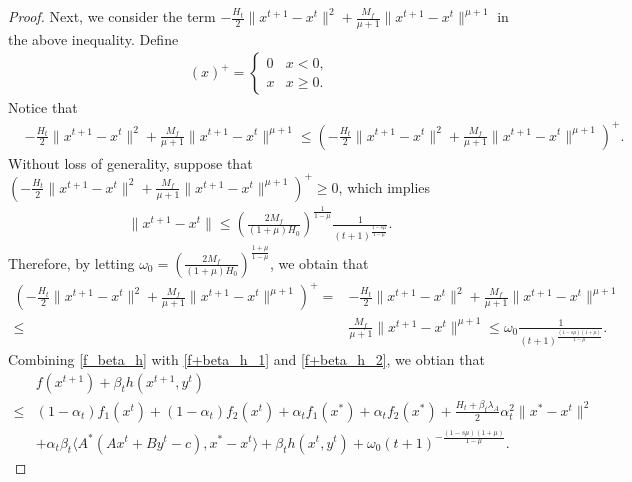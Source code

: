 \documentclass{article}
\numberwithin{equation}{section}
\begin{document}
\begin{proof}
    Next, we consider the term $-\frac{H_t}{2}\|x^{t+1}-x^t\rVert^2 +\frac{M_f}{\mu+1}\|x^{t+1}-x^t\rVert^{\mu+1}$ in 
    the above inequality. 
    Define 
    \begin{align}
        (x)^+ = \left\{ 
        \begin{array}{cc}
            0  & x<0,  \nonumber \\
            x & x \geq 0.  \nonumber
        \end{array}
     \right.  \nonumber
    \end{align}
    Notice that 
    \begin{align}
        &-\frac{H_t}{2}\|x^{t+1}-x^t\rVert^2 +\frac{M_f}{\mu+1}\|x^{t+1}-x^t\rVert^{\mu+1} \leq \left(-\frac{H_t}{2}\|x^{t+1}-x^t\rVert^2 +\frac{M_f}{\mu+1}\|x^{t+1}-x^t\rVert^{\mu+1}\right)^+.
        \label{f+beta_h_1}
    \end{align}
    Without loss of generality, suppose that  $\left(-\frac{H_t}{2}\|x^{t+1}-x^t\rVert^2 +\frac{M_f}{\mu+1}\|x^{t+1}-x^t\rVert^{\mu+1}\right)^+ \geq 0$, 
    which implies
    \begin{align}
        \|x^{t+1}-x^t\rVert \leq \left(\frac{2M_f}{(1+\mu)H_0}\right)^{\frac{1}{1-\mu}}\frac{1}{(t+1)^{\frac{1-s\mu}{1-\mu}}}. 
    \end{align}
    Therefore, by letting $\omega_0 = \left(\frac{2M_f}{(1+\mu)H_0}\right)^{\frac{1+\mu}{1-\mu}}$, we obtain that 
    \begin{align}
        \left(-\frac{H_t}{2}\|x^{t+1}-x^t\rVert^2 +\frac{M_f}{\mu+1}\|x^{t+1}-x^t\rVert^{\mu+1}\right)^+ =& -\frac{H_t}{2}\|x^{t+1}-x^t\rVert^2 +\frac{M_f}{\mu+1}\|x^{t+1}-x^t\rVert^{\mu+1} \nonumber \\
        \leq& \frac{M_f}{\mu+1}\|x^{t+1}-x^t\rVert^{\mu+1} \leq \omega_0 \frac{1}{(t+1)^{\frac{(1-s\mu)(1+\mu)}{1-\mu}}}. 
        \label{f+beta_h_2}
    \end{align}
    Combining \eqref{f_beta_h} with \eqref{f+beta_h_1} and \eqref{f+beta_h_2}, we obtian that 
    \begin{align} 
        &f(x^{t+1}) +\beta_th(x^{t+1},y^t) \nonumber \\
        \leq & (1-\alpha_t)f_1(x^t)+(1-\alpha_t)f_2(x^t) +\alpha_t f_1(x^*)+\alpha_tf_2(x^*)+\frac{H_t+\beta_t\lambda_A}{2}\alpha_t^2\|x^*-x^t\rVert^2 \nonumber \\
        &+\alpha_t\beta_t\langle A^*(Ax^t+By^t-c), x^*-x^t\rangle + \beta_th(x^t,y^t) +\omega_0(t+1)^{-\frac{(1-s\mu)(1+\mu)}{1-\mu}}.  \label{f+beta_h_holder}
    \end{align}  
    

\end{proof}
\end{document}

